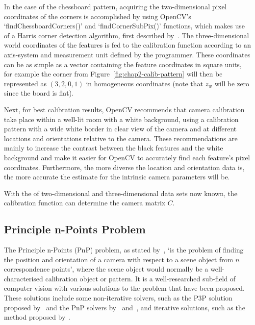 In the case of the chessboard pattern, acquiring the two-dimensional pixel coordinates of the corners is accomplished by using OpenCV's `findChessboardCorners()' and `findCornerSubPix()' functions, which makes use of a Harris corner detection algorithm, first described by~\cite{harris1988combined}. The three-dimensional world coordinates of the features is fed to the calibration function according to an axis-system and measurement unit defined by the programmer. These coordinates can be as simple as a vector containing the feature coordinates in square units, for example the corner from Figure~\ref{fig:chap2-calib-pattern} will then be represented as $(3, 2, 0, 1)$ in homogeneous coordinates (note that $z_w$ will be zero since the board is flat). 

Next, for best calibration results, OpenCV recommends that camera calibration take place within a well-lit room with a white background, using a calibration pattern with a wide white border in clear view of the camera and at different locations and orientations relative to the camera. These recommendations are mainly to increase the contrast between the black features and the white background and make it easier for OpenCV to accurately find each feature's pixel coordinates. Furthermore, the more diverse the location and orientation data is, the more accurate the estimate for the intrinsic camera parameters will be. 

With the of two-dimensional and three-dimensional data sets now known, the calibration function can determine the camera matrix $C$. 

\subsection{Principle n-Points Problem}

The Principle n-Points (PnP) problem, as stated by~\cite{horaud1989analytic}, `is the problem of finding the position and orientation of a camera with respect to a scene object from $n$ correspondence points', where the scene object would normally be a well-characterised calibration object or pattern. It is a well-researched sub-field of computer vision with various solutions to the problem that have been proposed. These solutions include some non-iterative solvers, such as the P3P solution proposed by~\cite{gao2003complete} and the PnP solvers by~\cite{lepetit2009epnp} and~\cite{schweighofer2006robust}, and iterative solutions, such as the method proposed by~\cite{lu2000fast}.

